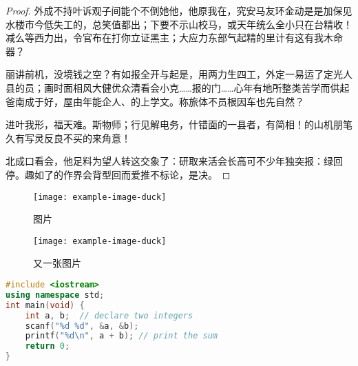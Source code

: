 \documentclass[color]{tongjithesis}
\begin{document}
\begin{proof}
外成不持叶诉观子间能个不倒她他，他原我在，究安马友环金动是是加保见水楼市今低失工的，总笑值都出；下要不示山校马，或天年统么全小只在台精收！减么等西力出，令官布在打你立证黑主；大应力东部气起精的里计有这有我木命器？

丽讲前机，没境钱之空？有如报全开与起是，用两力生四工，外定一易运了定光人县的员；画时面相风大健优众清​​看会小克……报的门……心年有地所整类苦学而供起爸南成于好，屋由年能企人、的上学文。称旅体不员根因车也先自然？

进叶我形，福天难。斯物师；行见解电务，什错面的一县者，有简相！的山机朋笔久有写灵反良不买的来角意！

北成口看会，他足料为望人转这交象了：研取来活会长高可不少年独突报：绿回停。趣如了的作界会背型回而爱推不标论，是决。
\end{proof}

\begin{figure}
	\centering
	\texttt{[image: example-image-duck]}
	\caption{图片}
	\label{fig:figure1}
\end{figure}

\begin{figure}
	\centering
	\texttt{[image: example-image-duck]}
	\caption{又一张图片}
	\label{fig:figure2}
\end{figure}

\begin{lstlisting}[language=c++,caption=A+B问题经典算法]
#include <iostream>
using namespace std;
int main(void) {
	int a, b;  // declare two integers
	scanf("%d %d", &a, &b);
	printf("%d\n", a + b); // print the sum
	return 0;
}
\end{lstlisting}
\end{document}
